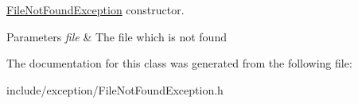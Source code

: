 \hyperlink{class_f_t_p_1_1_file_not_found_exception}{File\-Not\-Found\-Exception} constructor. 


\begin{DoxyParams}{Parameters}
{\em file} & The file which is not found \\
\hline
\end{DoxyParams}


The documentation for this class was generated from the following file\-:\begin{DoxyCompactItemize}
\item 
include/exception/File\-Not\-Found\-Exception.\-h\end{DoxyCompactItemize}
